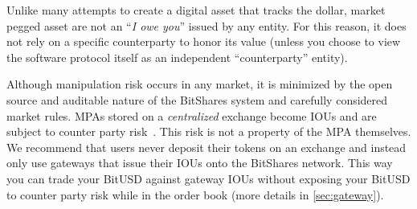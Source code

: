 Unlike many attempts to create a digital asset that tracks the dollar, market
pegged asset are not an ``\emph{I owe you}'' issued by any entity. For this
reason, it does not rely on a specific counterparty to honor its value (unless
you choose to view the software protocol itself as an independent
``counterparty'' entity). 

Although manipulation risk occurs in any market, it is minimized by the open
source and auditable nature of the BitShares system and carefully considered
market rules. MPAs stored on a \emph{centralized} exchange become IOUs and are
subject to counter party risk~\cite{mtgox}. This risk is not a property of the
MPA themselves. We recommend that users never deposit their tokens on an
exchange and instead only use gateways that issue their IOUs onto the BitShares
network. This way you can trade your BitUSD against gateway IOUs without
exposing your BitUSD to counter party risk while in the order book (more
details in \cref{sec:gateway}).
